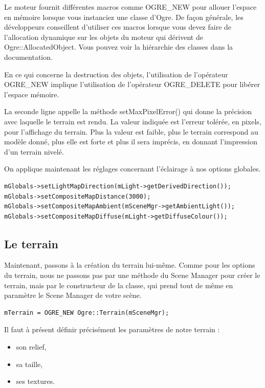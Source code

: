 Le moteur fournit différentes macros comme OGRE\_NEW pour allouer l'espace en mémoire lorsque vous instanciez une classe d'Ogre. De façon générale, les développeurs conseillent d'utiliser ces macros lorsque vous devez faire de l'allocation dynamique sur les objets du moteur qui dérivent de Ogre::AllocatedObject. Vous pouvez voir la hiérarchie des classes dans la documentation.

En ce qui concerne la destruction des objets, l'utilisation de l'opérateur OGRE\_NEW implique l'utilisation de l'opérateur OGRE\_DELETE pour libérer l'espace mémoire.

La seconde ligne appelle la méthode setMaxPixelError() qui donne la précision avec laquelle le terrain est rendu. La valeur indiquée est l'erreur tolérée, en pixels, pour l'affichage du terrain. Plus la valeur est faible, plus le terrain correspond au modèle donné, plus elle est forte et plus il sera imprécis, en donnant l'impression d'un terrain nivelé.

On applique maintenant les réglages concernant l'éclairage à nos options globales.

\begin{lstlisting}[caption={Application des réglages}]
mGlobals->setLightMapDirection(mLight->getDerivedDirection());
mGlobals->setCompositeMapDistance(3000);
mGlobals->setCompositeMapAmbient(mSceneMgr->getAmbientLight());
mGlobals->setCompositeMapDiffuse(mLight->getDiffuseColour());
\end{lstlisting}




\subsection{Le terrain}


Maintenant, passons à la création du terrain lui-même. Comme pour les options du terrain, nous ne passons pas par une méthode du Scene Manager pour créer le terrain, mais par le constructeur de la classe, qui prend tout de même en paramètre le Scene Manager de votre scène.

\begin{lstlisting}[caption={Création du terrain}]
mTerrain = OGRE_NEW Ogre::Terrain(mSceneMgr);
\end{lstlisting}

Il faut à présent définir précisément les paramètres de notre terrain :

\begin{itemize}
\item son relief, 
\item sa taille,
\item ses textures.
\end{itemize}

